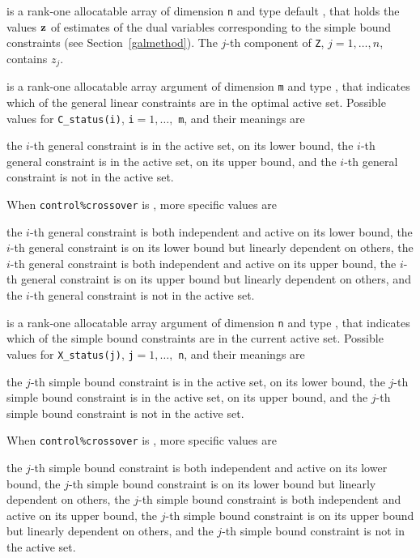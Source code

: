 \documentclass{galahad}
\begin{document}
\begin{description}
 is a rank-one allocatable array of dimension {\tt n} and type default
\realdp, that holds
the values ${\mathbf{z}}$ of estimates  of the dual variables
corresponding to the simple bound constraints (see Section~\ref{galmethod}).
The $j$-th component of {\tt Z}, $j = 1,  \ldots ,  n$, contains $z_{j}$.

 is a rank-one allocatable array argument of dimension {\tt m}
and type \integer, that indicates which of the general linear
constraints are in the optimal active set. Possible values for
{\tt C\_status(i)}, {\tt i}$=1, \ldots ,$ {\tt m}, and their meanings are
\begin{description}
 the $i$-th general constraint
is in the active set, on its lower bound,
 the $i$-th general constraint
is in the active set, on its upper bound, and
  the $i$-th general constraint is not in the active set.
\end{description}
When {\tt control\%crossover} is \true, more specific values are
\begin{description}
 the $i$-th general constraint
is both independent and active on its lower bound,
 the $i$-th general constraint
is on its lower bound but linearly dependent on others,
 the $i$-th general constraint
is both independent and active on its upper bound,
 the $i$-th general constraint
is on its upper bound but linearly dependent on others, and
 the $i$-th general constraint is not in the active set.
\end{description}

 is a rank-one allocatable array argument of dimension {\tt n}
and type \integer, that indicates which of the simple bound
constraints are in the current active set. Possible values for
{\tt X\_status(j)}, {\tt j}$=1, \ldots ,$ {\tt n}, and their meanings are
\begin{description}
 the $j$-th simple bound constraint
is in the active set, on its lower bound,
 the $j$-th simple bound constraint
is in the active set, on its upper bound, and
  the $j$-th simple bound constraint is not in the active set.
\end{description}
When {\tt control\%crossover} is \true, more specific values are
\begin{description}
 the $j$-th simple bound constraint
is both independent and active on its lower bound,
 the $j$-th simple bound constraint
is on its lower bound but linearly dependent on others,
 the $j$-th simple bound constraint
is both independent and active on its upper bound,
 the $j$-th simple bound constraint
is on its upper bound but linearly dependent on others, and
 the $j$-th simple bound constraint is not in the active set.
\end{description}

\end{description}
\end{document}

